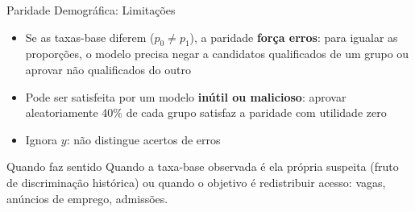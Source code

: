 \documentclass[aspectratio=169,xcolor=dvipsnames]{beamer}
\begin{document}
  \begin{frame}{Paridade Demográfica: Limitações}
    \begin{itemize}\setlength{\itemsep}{0.35em}
      \item Se as taxas-base diferem ($p_0 \neq p_1$), a paridade \textbf{força erros}: para igualar as proporções, o modelo precisa negar a candidatos qualificados de um grupo ou aprovar não qualificados do outro
      \item Pode ser satisfeita por um modelo \textbf{inútil ou malicioso}: aprovar aleatoriamente 40\% de cada grupo satisfaz a paridade com utilidade zero
      \item Ignora $y$: não distingue acertos de erros
    \end{itemize}

    \vspace{0.4em}
    \begin{alertblock}{Quando faz sentido}
      Quando a taxa-base observada é ela própria suspeita (fruto de discriminação histórica) ou quando o objetivo é redistribuir acesso: vagas, anúncios de emprego, admissões.
    \end{alertblock}
  \end{frame}
\end{document}
